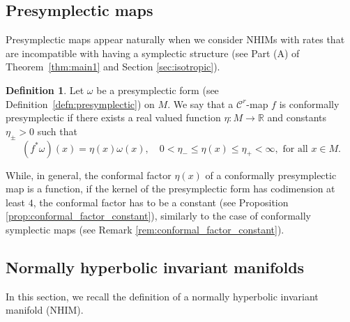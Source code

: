 \documentclass[11pt]{amsart}
\theoremstyle{definition}
\newtheorem{defn}[thm]{Definition}
\theoremstyle{remark}
\numberwithin{equation}{section}
\newcommand{\C}{\mathcal{C}}
\begin{document}
\subsection{Presymplectic maps}
\label{sec:presymp_maps}
Presymplectic maps appear naturally when we consider
NHIMs with rates that are incompatible with having
a symplectic structure (see
Part (A) of Theorem~\ref{thm:main1} and Section \ref{sec:isotropic}).

\begin{defn}
\label{defn:confpresymplectic}
Let $\omega$ be a presymplectic form (see Definition~\ref{defn:presymplectic})
on   $M$.
We say that a $\C^r$-map $f$ is conformally  presymplectic
if there exists a real valued function $\eta:M\to \mathbb{R}$  and constants $\eta_\pm >0$
such that
\begin{equation}
\label{confpresymplectic}
(f^* \omega)(x)   = \eta(x) \omega(x), \quad 0 < \eta_-\le \eta(x) \le \eta_+ < \infty , \textrm{ for all } x\in M.
\end{equation}
\end{defn}


While, in general, the conformal factor $\eta(x)$ of a conformally  presymplectic map is a function,  if the  kernel of the presymplectic form has codimension at least $4$, the   conformal factor  has to be a constant (see Proposition \ref{prop:conformal_factor_constant}), similarly to  the case of conformally symplectic maps (see Remark \ref{rem:conformal_factor_constant}).




\subsection{Normally hyperbolic invariant manifolds}
\label{sec:NHIM}

In this section, we recall the definition of a normally hyperbolic invariant manifold  (NHIM).
\end{document}
